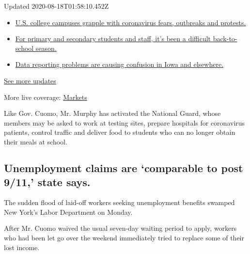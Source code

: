 Updated 2020-08-18T01:58:10.452Z

\begin{itemize}
\tightlist
\item
  \href{https://www.nytimes.com/2020/08/17/world/coronavirus-covid.html?action=click\&pgtype=Article\&state=default\&region=MAIN_CONTENT_1\&context=storylines_live_updates\#link-6fdbc8ef}{U.S.
  college campuses grapple with coronavirus fears, outbreaks and
  protests.}
\item
  \href{https://www.nytimes.com/2020/08/17/world/coronavirus-covid.html?action=click\&pgtype=Article\&state=default\&region=MAIN_CONTENT_1\&context=storylines_live_updates\#link-12d68713}{For
  primary and secondary students and staff, it's been a difficult
  back-to-school season.}
\item
  \href{https://www.nytimes.com/2020/08/17/world/coronavirus-covid.html?action=click\&pgtype=Article\&state=default\&region=MAIN_CONTENT_1\&context=storylines_live_updates\#link-6aa8318c}{Data
  reporting problems are causing confusion in Iowa and elsewhere.}
\end{itemize}

\href{https://www.nytimes.com/2020/08/17/world/coronavirus-covid.html?action=click\&pgtype=Article\&state=default\&region=MAIN_CONTENT_1\&context=storylines_live_updates}{See
more updates}

More live coverage:
\href{https://www.nytimes.com/live/2020/08/17/business/stock-market-today-coronavirus?action=click\&pgtype=Article\&state=default\&region=MAIN_CONTENT_1\&context=storylines_live_updates}{Markets}

Like Gov. Cuomo, Mr. Murphy has activated the National Guard, whose
members may be asked to work at testing sites, prepare hospitals for
coronavirus patients, control traffic and deliver food to students who
can no longer obtain their meals at school.

\hypertarget{unemployment-claims-are-comparable-to-post-911-state-says}{%
\subsection{Unemployment claims are `comparable to post 9/11,' state
says.}\label{unemployment-claims-are-comparable-to-post-911-state-says}}

The sudden flood of laid-off workers seeking unemployment benefits
swamped New York's Labor Department on Monday.

After Mr. Cuomo waived the usual seven-day waiting period to apply,
workers who had been let go over the weekend immediately tried to
replace some of their lost income.

